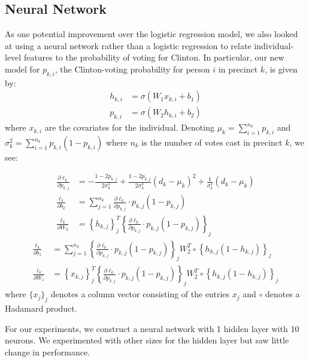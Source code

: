\documentclass[10pt, letterpaper]{article}
\begin{document}
\begin{multicols}{2}
\subsection{Neural Network} 
As one potential improvement over the logistic regression model, we also looked at using a neural network rather than a logistic regression to relate individual-level features to the probability of voting for Clinton. In particular, our new model for $p_{k, i}$, the Clinton-voting probability for person $i$ in precinct $k$, is given by: 
\begin{align*}
h_{k, i} &= \sigma\left(W_1 x_{k, i} + b_1 \right) \\
p_{k, i} &= \sigma\left(W_2 h_{k, i} + b_2 \right) 
\end{align*}
where $x_{k, i}$ are the covariates for the individual. Denoting $\mu_k = \sum_{i = 1}^{n_k} p_{k, i}$ and $\sigma_k^2 = \sum_{i = 1}^{n_k} p_{k, i} (1 - p_{k, i})$ where $n_k$ is the number of votes cast in precinct $k$, we see: 

\begin{align*}
\frac{\partial \ell_k}{\partial p_{k, j}} &= - \frac{1 - 2p_{k, j}}{2 \sigma_k^2} + \frac{1 - 2p_{k, j}}{2 \sigma_k^4} (d_k - \mu_k)^2  + \frac{1}{\sigma_k^2} \left(d_k - \mu_k \right) \\
\frac{\ell_k}{\partial b_2} &= \sum_{j = 1}^{n_k} \frac{\partial \ell_k}{\partial p_{k, j}} \cdot p_{k, j} (1 - p_{k, j}) \\
\frac{\ell_k}{\partial W_2} &= \left\{ h_{k, j} \right\}_j^T \left\{ \frac{\partial \ell_k}{\partial p_{k, j}} \cdot p_{k, j} (1 - p_{k, j})\right\}_{j} 
\end{align*}
\begin{align*}
\frac{\ell_k}{\partial b_1} &= \sum_{j = 1}^{n_k} \left\{ \frac{\partial \ell_k}{\partial p_{k, j}} \cdot p_{k, j} (1 - p_{k, j})\right\}_{j} W_2^T \circ \left\{ h_{k, j}(1 - h_{k, j})\right\}_j \\
\frac{\ell_k}{\partial W_1} &= \left\{ x_{k, j} \right\}_j^T \left\{ \frac{\partial \ell_k}{\partial p_{k, j}} \cdot p_{k, j} (1 - p_{k, j})\right\}_{j} W_2^T \circ \left\{ h_{k, j}(1 - h_{k, j})\right\}_j
\end{align*}
where $\{x_j\}_j$ denotes a column vector consisting of the entries $x_j$ and $\circ$ denotes a Hadamard product.

For our experiments, we construct a neural network with 1 hidden layer with 10 neurons. We experimented with other sizes for the hidden layer but saw little change in performance.


\end{multicols}
\end{document}
